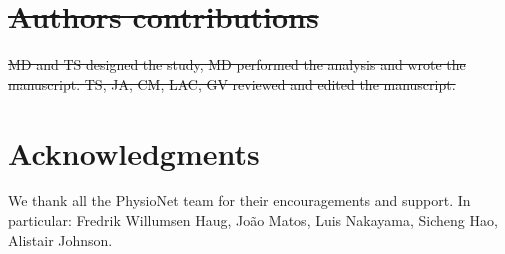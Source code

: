 \documentclass[10pt,letterpaper]{article}
\providecommand{\DIFdeltex}[1]{{\protect\color{red}\sout{#1}}}                      %
\providecommand{\DIFdelbegin}{} %
\providecommand{\DIFdelend}{} %
\providecommand{\DIFdel}[1]{\texorpdfstring{\DIFdeltex{#1}}{}} %
\newcommand{\DIFscaledelfig}{0.5}
\newlength{\DIFdelgraphicswidth} %
\newlength{\DIFdelgraphicsheight} %
\newcommand{\DIFdelincludegraphics}[2][]{%
\sbox{\DIFdelgraphicsbox}{\DIFOincludegraphics[#1]{#2}}%
\settoboxwidth{\DIFdelgraphicswidth}{\DIFdelgraphicsbox} %
\settoboxtotalheight{\DIFdelgraphicsheight}{\DIFdelgraphicsbox} %
\scalebox{\DIFscaledelfig}{%
\parbox[b]{\DIFdelgraphicswidth}{\usebox{\DIFdelgraphicsbox}\\[-\baselineskip] \rule{\DIFdelgraphicswidth}{0em}}\llap{\resizebox{\DIFdelgraphicswidth}{\DIFdelgraphicsheight}{%
\setlength{\unitlength}{\DIFdelgraphicswidth}%
\begin{picture}(1,1)%
\thicklines\linethickness{2pt} %
{\color[rgb]{1,0,0}\put(0,0){\framebox(1,1){}}}%
{\color[rgb]{1,0,0}\put(0,0){\line( 1,1){1}}}%
{\color[rgb]{1,0,0}\put(0,1){\line(1,-1){1}}}%
\end{picture}%
}\hspace*{3pt}}} %
} %
\DeclareRobustCommand{\DIFdelbegin}{\DIFOdelbegin \let\includegraphics\DIFdelincludegraphics} %
\DeclareRobustCommand{\DIFdelend}{\DIFOaddend \let\includegraphics\DIFOincludegraphics} %
\begin{document}
\DIFdelbegin \section*{\DIFdel{Authors contributions}}

\DIFdel{MD and TS designed the study, MD performed the analysis and wrote the manuscript.
  TS, JA, CM, LAC, GV reviewed and edited the manuscript.
}%

\DIFdelend \section*{Acknowledgments}

We thank all the PhysioNet team for their encouragements and support. In
particular: Fredrik Willumsen Haug, João Matos, Luis Nakayama, Sicheng Hao, Alistair Johnson.

\nolinenumbers
\end{document}
